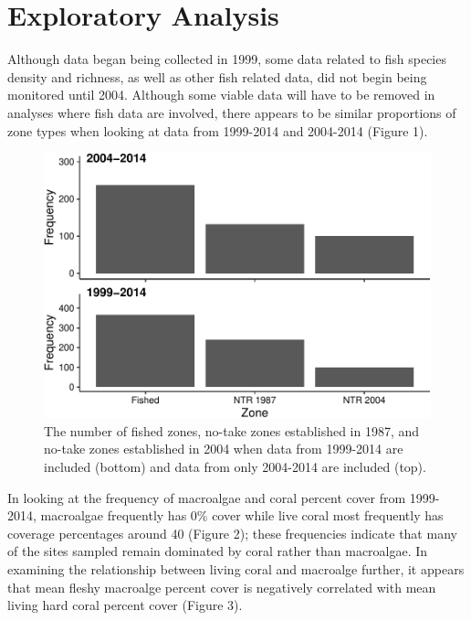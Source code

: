 \documentclass[12pt,]{article}
\begin{document}
\newpage

\hypertarget{exploratory-analysis}{%
\section{Exploratory Analysis}\label{exploratory-analysis}}

Although data began being collected in 1999, some data related to fish
species density and richness, as well as other fish related data, did
not begin being monitored until 2004. Although some viable data will
have to be removed in analyses where fish data are involved, there
appears to be similar proportions of zone types when looking at data
from 1999-2014 and 2004-2014 (Figure 1).

\begin{figure}

{\centering \includegraphics{Mullaney_ENV872_Project_files/figure-latex/Zone Exploratory Plot-1} 

}

\caption{The number of fished zones, no-take zones established in 1987, and no-take zones established in 2004 when data from 1999-2014 are included (bottom) and data from only 2004-2014 are included (top).}\label{fig:Zone Exploratory Plot}
\end{figure}

In looking at the frequency of macroalgae and coral percent cover from
1999-2014, macroalgae frequently has 0\% cover while live coral most
frequently has coverage percentages around 40 (Figure 2); these
frequencies indicate that many of the sites sampled remain dominated by
coral rather than macroalgae. In examining the relationship between
living coral and macroalge further, it appears that mean fleshy
macroalge percent cover is negatively correlated with mean living hard
coral percent cover (Figure 3).
\end{document}
